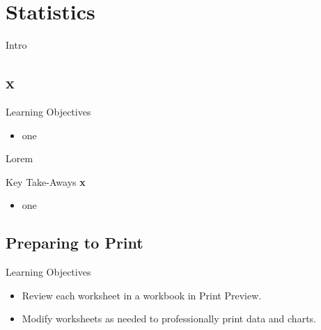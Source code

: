 \chapter{Statistics}\label{ch08:statistics}


Intro

\section{x}

\begin{center}
	\begin{objbox}{Learning Objectives}
		\begin{itemize}
			\setlength{\itemsep}{0pt}
			\setlength{\parskip}{0pt}
			\setlength{\parsep}{0pt}
			
			\item one

		\end{itemize}
	\end{objbox}
\end{center}

Lorem

\begin{center}
	\begin{tkwbox}{Key Take-Aways}
		\textbf{x}
		\\
		\begin{itemize}
			\setlength{\itemsep}{0pt}
			\setlength{\parskip}{0pt}
			\setlength{\parsep}{0pt}
			
			\item one
			
		\end{itemize}
	\end{tkwbox}
\end{center}

\section{Preparing to Print}

\begin{center}
	\begin{objbox}{Learning Objectives}
		\begin{itemize}
			\setlength{\itemsep}{0pt}
			\setlength{\parskip}{0pt}
			\setlength{\parsep}{0pt}
			
			\item Review each worksheet in a workbook in Print Preview.
			\item Modify worksheets as needed to professionally print data and charts.
			
		\end{itemize}
	\end{objbox}
\end{center}

